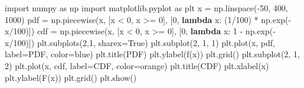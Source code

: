 \documentclass[
  letterpaper,
  DIV=11,
  numbers=noendperiod]{scrreport}
\newenvironment{Shaded}{\begin{snugshade}}{\end{snugshade}}
\newcommand{\DecValTok}[1]{\textcolor[rgb]{0.68,0.00,0.00}{#1}}
\newcommand{\ImportTok}[1]{\textcolor[rgb]{0.00,0.46,0.62}{#1}}
\newcommand{\KeywordTok}[1]{\textcolor[rgb]{0.00,0.23,0.31}{\textbf{#1}}}
\newcommand{\NormalTok}[1]{\textcolor[rgb]{0.00,0.23,0.31}{#1}}
\newcommand{\OperatorTok}[1]{\textcolor[rgb]{0.37,0.37,0.37}{#1}}
\newcommand{\StringTok}[1]{\textcolor[rgb]{0.13,0.47,0.30}{#1}}
\newcommand{\VariableTok}[1]{\textcolor[rgb]{0.07,0.07,0.07}{#1}}
\theoremstyle{definition}
\theoremstyle{plain}
\theoremstyle{definition}
\theoremstyle{plain}
\theoremstyle{remark}
\begin{document}
\begin{Shaded}
\begin{Highlighting}[numbers=left,,]
\ImportTok{import}\NormalTok{ numpy }\ImportTok{as}\NormalTok{ np}
\ImportTok{import}\NormalTok{ matplotlib.pyplot }\ImportTok{as}\NormalTok{ plt}
\NormalTok{x }\OperatorTok{=}\NormalTok{ np.linspace(}\OperatorTok{{-}}\DecValTok{50}\NormalTok{, }\DecValTok{400}\NormalTok{, }\DecValTok{1000}\NormalTok{)}
\NormalTok{pdf }\OperatorTok{=}\NormalTok{ np.piecewise(x, [x }\OperatorTok{\textless{}} \DecValTok{0}\NormalTok{, x }\OperatorTok{\textgreater{}=} \DecValTok{0}\NormalTok{], [}\DecValTok{0}\NormalTok{, }\KeywordTok{lambda}\NormalTok{ x: (}\DecValTok{1}\OperatorTok{/}\DecValTok{100}\NormalTok{) }\OperatorTok{*}\NormalTok{ np.exp(}\OperatorTok{{-}}\NormalTok{x}\OperatorTok{/}\DecValTok{100}\NormalTok{)])}
\NormalTok{cdf }\OperatorTok{=}\NormalTok{ np.piecewise(x, [x }\OperatorTok{\textless{}} \DecValTok{0}\NormalTok{, x }\OperatorTok{\textgreater{}=} \DecValTok{0}\NormalTok{], [}\DecValTok{0}\NormalTok{, }\KeywordTok{lambda}\NormalTok{ x: }\DecValTok{1} \OperatorTok{{-}}\NormalTok{ np.exp(}\OperatorTok{{-}}\NormalTok{x}\OperatorTok{/}\DecValTok{100}\NormalTok{)])}
\NormalTok{plt.subplots(}\DecValTok{2}\NormalTok{,}\DecValTok{1}\NormalTok{, sharex}\OperatorTok{=}\VariableTok{True}\NormalTok{)}
\NormalTok{plt.subplot(}\DecValTok{2}\NormalTok{, }\DecValTok{1}\NormalTok{, }\DecValTok{1}\NormalTok{)}
\NormalTok{plt.plot(x, pdf, label}\OperatorTok{=}\StringTok{\textquotesingle{}PDF\textquotesingle{}}\NormalTok{, color}\OperatorTok{=}\StringTok{\textquotesingle{}blue\textquotesingle{}}\NormalTok{)}
\NormalTok{plt.title(}\StringTok{\textquotesingle{}PDF\textquotesingle{}}\NormalTok{)}
\NormalTok{plt.ylabel(}\StringTok{\textquotesingle{}f(x)\textquotesingle{}}\NormalTok{)}
\NormalTok{plt.grid()}
\NormalTok{plt.subplot(}\DecValTok{2}\NormalTok{, }\DecValTok{1}\NormalTok{, }\DecValTok{2}\NormalTok{)}
\NormalTok{plt.plot(x, cdf, label}\OperatorTok{=}\StringTok{\textquotesingle{}CDF\textquotesingle{}}\NormalTok{, color}\OperatorTok{=}\StringTok{\textquotesingle{}orange\textquotesingle{}}\NormalTok{)}
\NormalTok{plt.title(}\StringTok{\textquotesingle{}CDF\textquotesingle{}}\NormalTok{)}
\NormalTok{plt.xlabel(}\StringTok{\textquotesingle{}x\textquotesingle{}}\NormalTok{)}
\NormalTok{plt.ylabel(}\StringTok{\textquotesingle{}F(x)\textquotesingle{}}\NormalTok{)}
\NormalTok{plt.grid()}
\NormalTok{plt.show()}
\end{Highlighting}
\end{Shaded}
\end{document}
